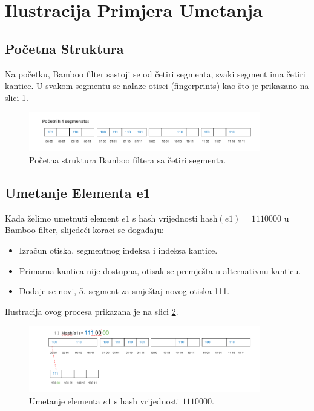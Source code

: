 \documentclass[seminarskirad]{fer}
\begin{document}
	
	\section{Ilustracija Primjera Umetanja}
	\subsection{Početna Struktura}
	Na početku, Bamboo filter sastoji se od četiri segmenta, svaki segment ima četiri kantice. U svakom segmentu se nalaze otisci (fingerprints) kao što je prikazano na slici \ref{fig:initial_segments}.
	
	
	\begin{figure}[h]
		\centering
		\includegraphics[width=0.9\textwidth]{images/initial_segments.png}
		\caption{Početna struktura Bamboo filtera sa četiri segmenta.}
		\label{fig:initial_segments}
	\end{figure}
	
	\subsection{Umetanje Elementa e1}
	Kada želimo umetnuti element \( e1 \) s hash vrijednosti \( \text{hash}(e1) = 1110000 \) u Bamboo filter, slijedeći koraci se događaju:
	\begin{itemize}
		\item Izračun otiska, segmentnog indeksa i indeksa kantice.
		\item Primarna kantica nije dostupna, otisak se premješta u alternativnu kanticu.
		\item Dodaje se novi, 5. segment za smještaj novog otiska 111.
	\end{itemize}
	Ilustracija ovog procesa prikazana je na slici \ref{fig:insertion_e1}.
	
	\begin{figure}[h]
		\centering
		\includegraphics[width=0.9\textwidth]{images/umetanje_el1.png}
		\caption{Umetanje elementa \( e1 \) s hash vrijednosti \( 1110000 \).}
		\label{fig:insertion_e1}
	\end{figure}
	
\end{document}
